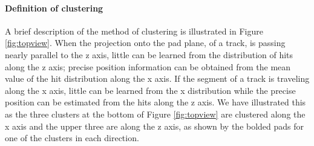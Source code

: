 \documentclass[review]{elsarticle}
\begin{document}
\paragraph{Definition of clustering}
A brief description of the method of clustering is illustrated in Figure \ref{fig:topview}. When the projection onto the pad plane, of a track, is passing nearly parallel to the z axis, little can be learned from the distribution of hits along the z axis; precise position information can be obtained from the mean value of the hit distribution along the x axis. If the segment of a track is traveling along the x axis, little can be learned from the x distribution while the precise position can be estimated from the hits along the z axis. We have illustrated this as the three clusters at the bottom of Figure \ref{fig:topview} are clustered along the x axis and the upper three are along the z axis, as shown by the bolded pads for one of the clusters in each direction.
\end{document}

